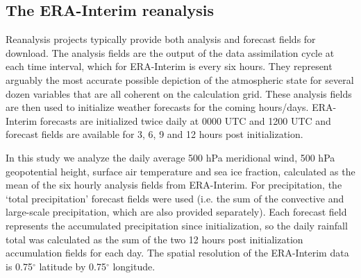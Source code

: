 \subsection{The ERA-Interim reanalysis}

Reanalysis projects typically provide both analysis and forecast fields for download. The analysis fields are the output of the data assimilation cycle at each time interval, which for ERA-Interim is every six hours. They represent arguably the most accurate possible depiction of the atmospheric state for several dozen variables that are all coherent on the calculation grid. These analysis fields are then used to initialize weather forecasts for the coming hours/days. ERA-Interim forecasts are initialized twice daily at 0000 UTC and 1200 UTC and forecast fields are available for 3, 6, 9 and 12 hours post initialization.  

In this study we analyze the daily average 500 hPa meridional wind, 500 hPa geopotential height, surface air temperature and sea ice fraction, calculated as the mean of the six hourly analysis fields from ERA-Interim. For precipitation, the `total precipitation' forecast fields were used (i.e. the sum of the convective and large-scale precipitation, which are also provided separately). Each forecast field represents the accumulated precipitation since initialization, so the daily rainfall total was calculated as the sum of the two 12 hours post initialization accumulation fields for each day. The spatial resolution of the ERA-Interim data is 0.75$^{\circ}$ latitude by 0.75$^{\circ}$ longitude.   